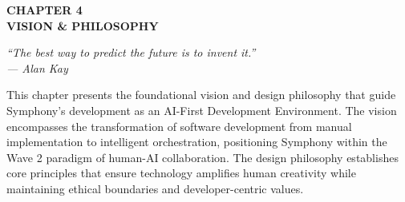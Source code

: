 
\begin{center}
{\Huge\textcolor{brandPrimary}{\textbf{CHAPTER 4}}}\\[0.5cm]
{\LARGE\textcolor{brandSecondary}{\textbf{VISION \& PHILOSOPHY}}}\\[1cm]

\begin{tcolorbox}[
    colback=brandPrimary!5,
    colframe=brandPrimary,
    width=0.85\textwidth,
    arc=3mm,
    boxrule=1pt
]
\centering
\large
\textit{``The best way to predict the future is to invent it.''}\\[0.3cm]
\textit{— Alan Kay}
\end{tcolorbox}

\vspace{1cm}

{\large
This chapter presents the foundational vision and design philosophy that guide Symphony's development as an AI-First Development Environment. The vision encompasses the transformation of software development from manual implementation to intelligent orchestration, positioning Symphony within the Wave 2 paradigm of human-AI collaboration. The design philosophy establishes core principles that ensure technology amplifies human creativity while maintaining ethical boundaries and developer-centric values.
}

\end{center}

\vspace{1.5cm}
